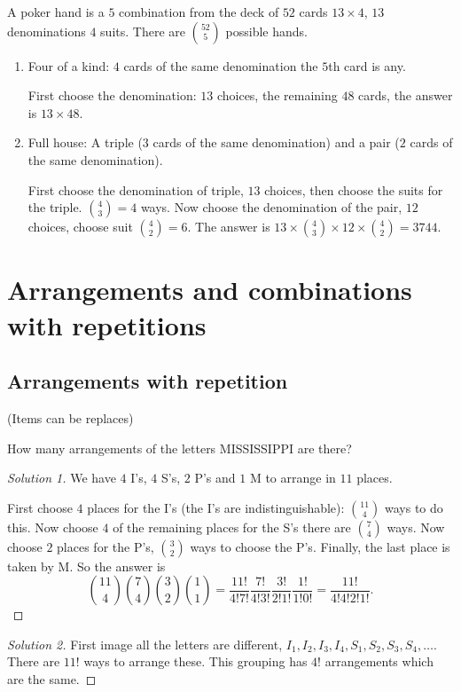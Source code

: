 \documentclass[10pt, a4paper]{article}
\begin{document}
\begin{example}
    A poker hand is a $5$ combination from the deck of $52$ cards $13 \times 4$, $13$ denominations $4$ suits. There are $\binom{52}{5}$ possible hands.
    \begin{enumerate}[label = (\alph*)]
        \item Four of a kind: $4$ cards of the same denomination the $5$th card is any.

        First choose the denomination: $13$ choices, the remaining $48$ cards, the answer is $13 \times 48$.

        \item Full house: A triple ($3$ cards of the same denomination) and a pair ($2$ cards of the same denomination).

        First choose the denomination of triple, $13$ choices, then choose the suits for the triple. $\binom{4}{3} = 4$ ways.
        Now choose the denomination of the pair, $12$ choices, choose suit $\binom{4}{2} = 6$. The answer is $13 \times \binom{4}{3} \times 12 \times \binom{4}{2} = 3744$.
    \end{enumerate}
\end{example}

\newpage

\section{Arrangements and combinations with repetitions}

\subsection{Arrangements with repetition}

(Items can be replaces)
\begin{example}
    How many arrangements of the letters MISSISSIPPI are there?

    \begin{proof}[Solution 1]\renewcommand{\qedsymbol}{}
        We have $4$ I's, $4$ S's, $2$ P's and $1$ M to arrange in $11$ places.

        First choose $4$ places for the I's (the I's are indistinguishable): $\binom{11}{4}$ ways to do this.
        Now choose $4$ of the remaining places for the S's there are $\binom{7}{4}$ ways.
        Now choose $2$ places for the P's, $\binom{3}{2}$ ways to choose the P's.
        Finally, the last place is taken by M.
        So the answer is
        \[
        \binom{11}{4}\binom{7}{4}\binom{3}{2}\binom{1}{1} = \frac{11!}{4!7!}\frac{7!}{4!3!}\frac{3!}{2!1!}\frac{1!}{1!0!} = \frac{11!}{4!4!2!1!}.
        \]
    \end{proof}
    \begin{proof}[Solution 2]\renewcommand{\qedsymbol}{}
        First image all the letters are different, $I_1, I_2, I_3, I_4, S_1, S_2, S_3, S_4,\dotsc$.
        There are $11!$ ways to arrange these.
        This grouping has $4!$ arrangements which are the same.
    \end{proof}
\end{example}
\end{document}
